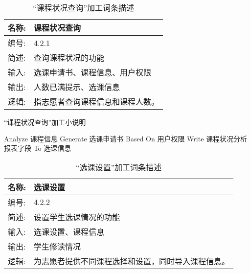 \begin{table}[H]  
\caption{“课程状况查询”加工词条描述}  
\begin{center}  
    \begin{tabular}{l p{11cm}} 
        \hline
        \quad 名称: & 课程状况查询 \\
        \hline
        \quad 编号: & 4.2.1 \\
        \hline
        \quad 简述: & 查询课程状况的功能 \\
        \hline
        \quad 输入: & 选课申请书、课程信息、用户权限 \\
        \hline
        \quad 输出: & 人数已满提示、选课信息 \\
        \hline
        \quad 逻辑: & 指志愿者查询课程信息和课程人数。 \\
        \hline
    \end{tabular}
    \label{tab1}
\end{center}
\end{table}


\begin{algorithm}[H]
    \renewcommand{\thealgorithm}{}
    \caption{“课程状况查询”加工小说明} 
    \label{alg3} 
    \begin{algorithmic}[1]
        \STATE Analyze 课程信息
        \STATE Generate 选课申请书 Based On 用户权限
        \STATE Write 课程状况分析报表字段 To 选课信息
    \end{algorithmic} 
\end{algorithm}

\begin{table}[H]  
\caption{“选课设置”加工词条描述}  
\begin{center}  
    \begin{tabular}{l p{11cm}} 
        \hline
        \quad 名称: & 选课设置 \\
        \hline
        \quad 编号: & 4.2.2 \\
        \hline
        \quad 简述: & 设置学生选课情况的功能 \\
        \hline
        \quad 输入: & 选课设置、课程信息\\
        \hline
        \quad 输出: & 学生修读情况 \\
        \hline
        \quad 逻辑: & 为志愿者提供不同课程选择和设置，同时导入课程信息。 \\
        \hline
    \end{tabular}
    \label{tab1}
\end{center}
\end{table}



